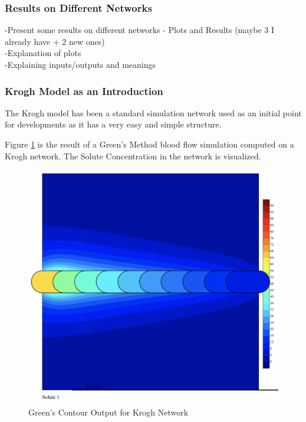 \subsubsection{Results on Different Networks}

-Present some results on different networks - Plots and Results (maybe 3 I already have + 2 new ones)
\\-Explanation of plots
\\-Explaining inputs/outputs and meanings

\subsubsection*{Krogh Model as an Introduction}

The Krogh model has been a standard simulation network used as an initial point for developments as it has a very easy and simple structure.

Figure \ref{fig:Contour_Krogh}  is the result of a Green's Method blood flow simulation computed on a Krogh network. The Solute Concentration in the network is visualized.\\
\begin{figure}[h]
\centering
\includegraphics[width=120mm]{Contour_Krogh}
\caption{\footnotesize Green's Contour Output for Krogh Network}
\label{fig:Contour_Krogh}
\end{figure}

